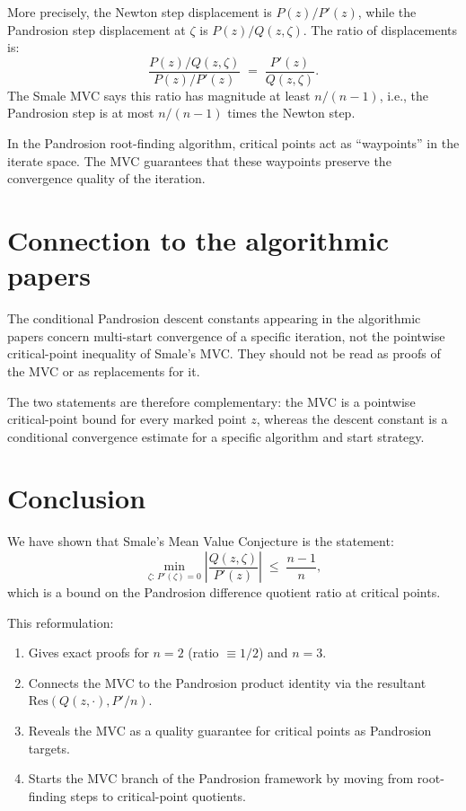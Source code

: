 \documentclass[11pt,a4paper]{article}
\begin{document}
More precisely, the Newton step displacement is $P(z)/P'(z)$, while the Pandrosion step displacement at $\zeta$ is $P(z)/Q(z, \zeta)$. The ratio of displacements is:
\begin{equation*}
\frac{P(z)/Q(z, \zeta)}{P(z)/P'(z)} \;=\; \frac{P'(z)}{Q(z, \zeta)}.
\end{equation*}
The Smale MVC says this ratio has magnitude at least $n/(n - 1)$, i.e., the Pandrosion step is at most $n/(n - 1)$ times the Newton step.

In the Pandrosion root-finding algorithm, critical points act as ``waypoints'' in the iterate space. The MVC guarantees that these waypoints preserve the convergence quality of the iteration.

\section{Connection to the algorithmic papers}

The conditional Pandrosion descent constants appearing in the algorithmic
papers concern multi-start convergence of a specific iteration, not the
pointwise critical-point inequality of Smale's MVC. They should not be read as
proofs of the MVC or as replacements for it.

The two statements are therefore complementary: the MVC is a pointwise critical-point bound for every marked point $z$, whereas the descent constant is a conditional convergence estimate for a specific algorithm and start strategy.

\section{Conclusion}

We have shown that Smale's Mean Value Conjecture is the statement:
\begin{equation*}
\min_{\zeta:\, P'(\zeta) = 0} \left|\frac{Q(z, \zeta)}{P'(z)}\right| \;\le\; \frac{n - 1}{n},
\end{equation*}
which is a bound on the Pandrosion difference quotient ratio at critical points.

This reformulation:
\begin{enumerate}
\item Gives exact proofs for $n = 2$ (ratio $\equiv 1/2$) and $n = 3$.
\item Connects the MVC to the Pandrosion product identity via the resultant $\mathrm{Res}(Q(z, \cdot), P'/n)$.
\item Reveals the MVC as a quality guarantee for critical points as Pandrosion targets.
\item Starts the MVC branch of the Pandrosion framework by moving from root-finding steps to critical-point quotients.
\end{enumerate}
\end{document}
